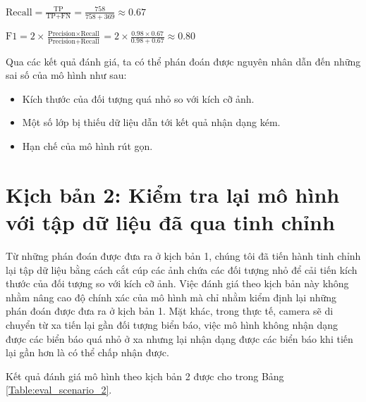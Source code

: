 \documentclass[../thesis.tex]{subfiles}
\begin{document}
$\text{Recall} = \displaystyle\frac{\text{TP}}{\text{TP} + \text{FN}} = \frac{758}{758 + 369} \approx 0.67$

$\text{F1} = 2 \times \displaystyle\frac{\text{Precision} \times \text{Recall}}{\text{Precision} + \text{Recall}} = 2 \times \frac{0.98 \times 0.67}{0.98 + 0.67} \approx 0.80$

Qua các kết quả đánh giá, ta có thể phán đoán được nguyên nhân dẫn đến những sai số của mô hình như sau:

\begin{itemize}[topsep=0pt]
    \item Kích thước của đối tượng quá nhỏ so với kích cỡ ảnh.
    \item Một số lớp bị thiếu dữ liệu dẫn tới kết quả nhận dạng kém.
	\item Hạn chế của mô hình rút gọn.
\end{itemize} 

\section{Kịch bản 2: Kiểm tra lại mô hình với tập dữ liệu đã qua tinh chỉnh}

Từ những phán đoán được đưa ra ở kịch bản 1, chúng tôi đã tiến hành tinh chỉnh lại tập dữ liệu bằng cách cắt cúp các ảnh chứa các đối tượng nhỏ để cải tiến kích thước của đối tượng so với kích cỡ ảnh. Việc đánh giá theo kịch bản này không nhằm nâng cao độ chính xác của mô hình mà chỉ nhằm kiểm định lại những phán đoán được đưa ra ở kịch bản 1. Mặt khác, trong thực tế, camera sẽ di chuyển từ xa tiến lại gần đối tượng biển báo, việc mô hình không nhận dạng được các biển báo quá nhỏ ở xa nhưng lại nhận dạng được các biển báo khi tiến lại gần hơn là có thể chấp nhận được.

Kết quả đánh giá mô hình theo kịch bản 2 được cho trong Bảng \ref{Table:eval_scenario_2}.
\end{document}
